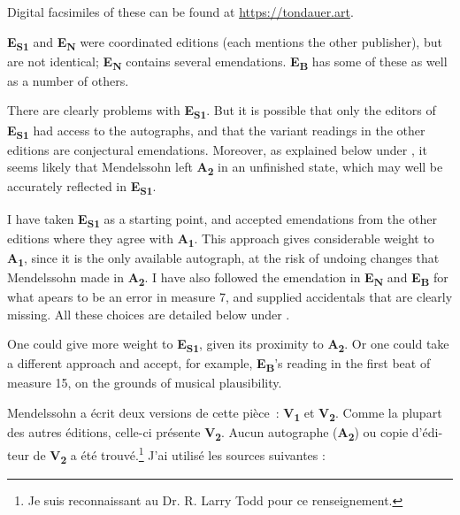 \documentclass[a4paper, 12pt]{book}
\newcommand{\source}[2]{\textbf{#1\textsubscript{#2}}}
\newcommand{\bigdot}[0]{{\Large \textbullet}}
\newcommand{\centerbigdot}[0]{\begin{center}\bigdot\end{center}}
\begin{document}
{    Digital facsimiles of these can be found at
    \url{https://tondauer.art}.

    \source{E}{S1} and \source{E}{N} were coordinated editions (each
    mentions the other publisher), but are not identical;
    \source{E}{N} contains several emendations. \source{E}{B} has some
    of these as well as a number of others.

    There are clearly problems with \source{E}{S1}. But it is possible
    that only the editors of \source{E}{S1} had access to the
    autographs, and that the variant readings in the other editions
    are conjectural emendations. Moreover, as explained below under
    , it seems likely that Mendelssohn left
    \source{A}{2} in an unfinished state, which may well be accurately
    reflected in \source{E}{S1}.

    I have taken \source{E}{S1} as a starting point, and accepted
    emendations from the other editions where they agree with
    \source{A}{1}. This approach gives considerable weight to
    \source{A}{1}, since it is the only available autograph, at the
    risk of undoing changes that Mendelssohn made in \source{A}{2}.  I
    have also followed the emendation in \source{E}{N} and
    \source{E}{B} for what apears to be an error in measure 7, and
    supplied accidentals that are clearly missing. All these choices
    are detailed below under .

    One could give more weight to \source{E}{S1}, given its proximity
    to \source{A}{2}. Or one could take a different approach and
    accept, for example, \source{E}{B}'s reading in the first beat of
    measure 15, on the grounds of musical plausibility.

    \centerbigdot

    \begin{otherlanguage}{french}
    Mendelssohn a écrit deux versions de cette pièce~: \source{V}{1} et
    \source{V}{2}. Comme la plupart des autres éditions, celle-ci présente
    \source{V}{2}. Aucun autographe (\source{A}{2}) ou copie d'éditeur
    de \source{V}{2} a été trouvé.\footnote{Je suis reconnaissant au
      Dr. R. Larry Todd pour ce renseignement.} J'ai utilisé les sources
    suivantes :
    

\end{otherlanguage}}
\end{document}
